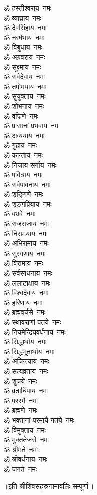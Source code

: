\begin{multicols}{2}
\begin{flushleft}
ॐ हस्तीश्वराय~नमः\\
ॐ व्याघ्राय~नमः\\
ॐ देवसिंहाय~नमः\\
ॐ नरर्षभाय~नमः\\
ॐ विबुधाय~नमः\\
ॐ अग्रवराय~नमः\\
ॐ सूक्ष्माय~नमः\\
ॐ सर्वदेवाय~नमः\\
ॐ तपोमयाय~नमः\\
ॐ सुयुक्ताय~नमः\hfill{}\\
ॐ शोभनाय~नमः\\
ॐ वज्रिणे~नमः\\
ॐ प्रासानां प्रभवाय~नमः\\
ॐ अव्ययाय~नमः\\
ॐ गुहाय~नमः\\
ॐ कान्ताय~नमः\\
ॐ निजाय सर्गाय~नमः\\
ॐ पवित्राय~नमः\\
ॐ सर्वपावनाय~नमः\\
ॐ शृङ्गिणे~नमः\hfill{}\\
ॐ शृङ्गप्रियाय~नमः\\
ॐ बभ्रवे~नमः\\
ॐ राजराजाय~नमः\\
ॐ निरामयाय~नमः\\
ॐ अभिरामाय~नमः\\
ॐ सुरगणाय~नमः\\
ॐ विरामाय~नमः\\
ॐ सर्वसाधनाय~नमः\\
ॐ ललाटाक्षाय~नमः\\
ॐ विश्वदेवाय~नमः\hfill{}\\
ॐ हरिणाय~नमः\\
ॐ ब्रह्मवर्चसे~नमः\\
ॐ स्थावराणां पतये~नमः\\
ॐ नियमेन्द्रियवर्धनाय~नमः\\
ॐ सिद्धार्थाय~नमः\\
ॐ सिद्धभूतार्थाय~नमः\\
ॐ अचिन्त्याय~नमः\\
ॐ सत्यव्रताय~नमः\\
ॐ शुचये~नमः\\
ॐ व्रताधिपाय~नमः\hfill{}\\
ॐ परस्मै~नमः\\
ॐ ब्रह्मणे~नमः\\
ॐ भक्तानां परमायै गतये~नमः\\
ॐ विमुक्ताय~नमः\\
ॐ मुक्ततेजसे~नमः\\
ॐ श्रीमते~नमः\\
ॐ श्रीवर्धनाय~नमः\\
ॐ जगते~नमः\\
\end{flushleft}
\end{multicols}
\centerline{॥इति श्रीशिवसहस्रनामावलिः सम्पूर्णा॥}
